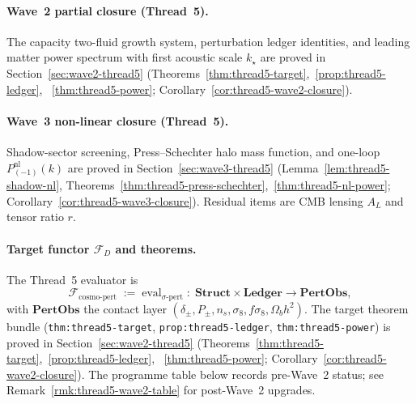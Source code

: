 \paragraph{Wave~2 partial closure (Thread~5).}
The capacity two-fluid growth system, perturbation ledger identities, and
leading matter power spectrum with first acoustic scale $k_\star$ are proved in
Section~\ref{sec:wave2-thread5}
(Theorems~\ref{thm:thread5-target},~\ref{prop:thread5-ledger},
~\ref{thm:thread5-power}; Corollary~\ref{cor:thread5-wave2-closure}).

\paragraph{Wave~3 non-linear closure (Thread~5).}
Shadow-sector screening, Press--Schechter halo mass function, and one-loop
$P_{(-1)}^{\mathrm{nl}}(k)$ are proved in Section~\ref{sec:wave3-thread5}
(Lemma~\ref{lem:thread5-shadow-nl},
Theorems~\ref{thm:thread5-press-schechter},~\ref{thm:thread5-nl-power};
Corollary~\ref{cor:thread5-wave3-closure}).
Residual items are CMB lensing $A_L$ and tensor ratio $r$.

\paragraph{Target functor $\mathcal{F}_D$ and theorems.}
The Thread~5 evaluator is
\begin{equation}\label{eq:FD-cosmo-pert}
  \mathcal{F}_{\mathrm{cosmo\text{-}pert}}
  \;:=\;
  \mathrm{eval}_{\sigma\text{-}\mathrm{pert}}
  \;:\;
  \mathbf{Struct}\times\mathbf{Ledger}
  \longrightarrow
  \mathbf{PertObs},
\end{equation}
with $\mathbf{PertObs}$ the contact layer
$(\delta_\pm,P_\pm,n_s,\sigma_8,f\sigma_8,\Omega_b h^2)$.
The target theorem bundle
(\texttt{thm:thread5-target}, \texttt{prop:thread5-ledger},
\texttt{thm:thread5-power}) is proved in Section~\ref{sec:wave2-thread5}
(Theorems~\ref{thm:thread5-target},~\ref{prop:thread5-ledger},
~\ref{thm:thread5-power}; Corollary~\ref{cor:thread5-wave2-closure}).
The programme table below records pre-Wave~2 status; see
Remark~\ref{rmk:thread5-wave2-table} for post-Wave~2 upgrades.


